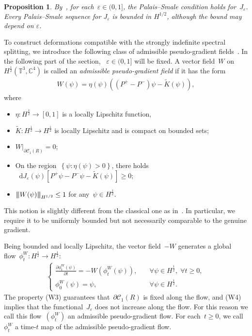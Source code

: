 \documentclass[11pt,final]{amsart}
\newcommand{\tnorm}[1]{%
  \left\vert\kern-0.3ex\left\vert\kern-0.3ex\left\vert #1 \right\vert\kern-0.3ex\right\vert\kern-0.3ex\right\vert
}
\newcommand{\parenthesis}[1]{\left(#1\right)} %
\newcommand{\braces}[1]{\left\{#1\right\}} %
\newcommand{\C}{\mathbb{C}}
\newcommand{\T}{\mathbb{T}}
\newcommand{\dd}{\mathop{}\!\mathrm{d}}
\newcommand{\eps}{\varepsilon}
\newcommand{\p}{\partial}
\newtheorem{prop}[thm]{Proposition}
\begin{document}
\begin{prop}
    By~\cite[Section 4.1]{WZ2026Stationary}, for each~$\eps\in (0,1]$, the Palais--Smale condition holds for~$J_\eps$. Every Palais--Smale sequence for $J_\eps$ is bounded in $H^{1/2}$, although the bound may depend on $\eps$.
\end{prop}





To construct deformations compatible with the strongly indefinite spectral splitting, we introduce the following class of admissible pseudo-gradient fields~\cite{WZ2026Stationary}. In the following part of the section, ~$\eps\in(0,1]$ will be fixed. A vector field~$W$ on~$H^{\frac{1}{2}}(\T^3,\C^4)$ is called an \emph{admissible pseudo-gradient field} if it has the form
\begin{align}
    W(\psi)= \eta(\psi) \parenthesis{ (P^+ -P^- )\psi - \widetilde{K}(\psi)},
\end{align}
where
\begin{itemize}
    \item[(W1)] $\eta\colon H^{\frac{1}{2}}\to [0,1]$ is a locally Lipschitz function,
    \item[(W2)] $\widetilde{K}\colon H^{\frac{1}{2}}\to H^{\frac{1}{2}}$ is locally Lipschitz and is compact on bounded sets;
    \item[(W3)] $W|_{\p\mathscr{C}_1(R)} = 0$;
    \item[(W4)] On the region~$\braces{\psi\colon \eta(\psi)>0}$, there holds~$\dd J_\eps(\psi)[P^+\psi -P^- \psi -\widetilde{K}(\psi)]\geq 0$;
    \item[(W5)] $\tnorm{W(\psi)}_{H^{1/2}} \leq 1$ for any~$\psi\in H^{\frac{1}{2}}$.
\end{itemize}
This notion is slightly different from the classical one as in~\cite{Ambrosetti2007Nonlinear}.
In particular, we require it to be uniformly bounded but not necessarily comparable to the genuine gradient.

Being bounded and locally Lipschitz, the vector field~$-W$ generates a global flow~$\phi^W_t\colon H^{\frac{1}{2}}\to H^{\frac{1}{2}}$:
\begin{align}
    \begin{cases}
        \frac{\p\phi^W_t(\psi)}{\p t} = - W(\phi^W_t(\psi)), & \quad \forall \psi \in H^{\frac{1}{2}}, \; \forall t\geq 0, \\
        \phi^W_0(\psi)=\psi, & \quad \forall \psi\in H^{\frac{1}{2}}.
    \end{cases}
\end{align}
The property (W3) guarantees that~$\p\mathscr{C}_1(R)$ is fixed along the flow, and (W4) implies that the functional~$J_\eps$ does not increase along the flow.
For this reason we call this flow~$(\phi^W_t)$ an admissible pseudo-gradient flow.
For each~$t\geq 0$, we call~$\phi^W_t$ a time-$t$ map of the admissible pseudo-gradient flow.
\end{document}
